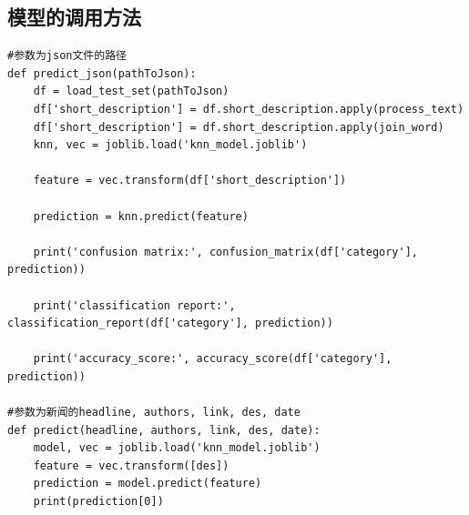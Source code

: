 \documentclass{article}
\begin{document}
\subsection{模型的调用方法}

\begin{lstlisting}
#参数为json文件的路径
def predict_json(pathToJson):
    df = load_test_set(pathToJson)
    df['short_description'] = df.short_description.apply(process_text)
    df['short_description'] = df.short_description.apply(join_word)
    knn, vec = joblib.load('knn_model.joblib')

    feature = vec.transform(df['short_description'])

    prediction = knn.predict(feature)

    print('confusion matrix:', confusion_matrix(df['category'], prediction))

    print('classification report:', classification_report(df['category'], prediction))

    print('accuracy_score:', accuracy_score(df['category'], prediction))

#参数为新闻的headline, authors, link, des, date
def predict(headline, authors, link, des, date):
    model, vec = joblib.load('knn_model.joblib')
    feature = vec.transform([des])
    prediction = model.predict(feature)
    print(prediction[0])
\end{lstlisting}
\end{document}
